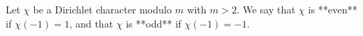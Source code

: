 Let $\chi$ be a Dirichlet character modulo $m$ with $m > 2$. We say that $\chi$ is **even** if $\chi(-1) = 1$, and that $\chi$ is **odd** if $\chi(-1) = -1$.
